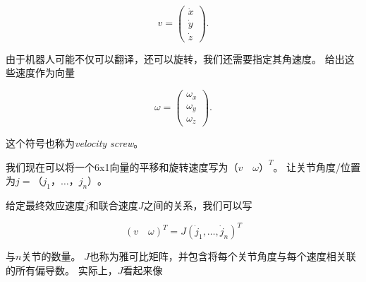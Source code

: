 \begin{equation}
v=\left(\begin{array}{c}
\dot{x}\\
\dot{y}\\
\dot{z}
\end{array}
\right).
\end{equation}


 由于机器人可能不仅可以翻译，还可以旋转，我们还需要指定其角速度。 给出这些速度作为向量

\begin{equation}
\omega=\left(\begin{array}{c}
\omega_x\\
\omega_y\\
\omega_z
\end{array}
\right).
\end{equation}


这个符号也称为\emph {velocity screw}。 


我们现在可以将一个6x1向量的平移和旋转速度写为$（v \quad \omega）^ T $。 让关节角度/位置为$ j =（j_1，\ldots，j_n）$。


给定最终效应速度$ \dot {j} $和联合速度$ J $之间的关系，我们可以写

\begin{equation}
 (v \quad \omega)^T=J(\dot{j}_1,\ldots,\dot{j}_n)^T
\end{equation}


与$ n $关节的数量。 $ J $也称为雅可比矩阵，并包含将每个关节角度与每个速度相关联的所有偏导数。 实际上，$ J $看起来像

